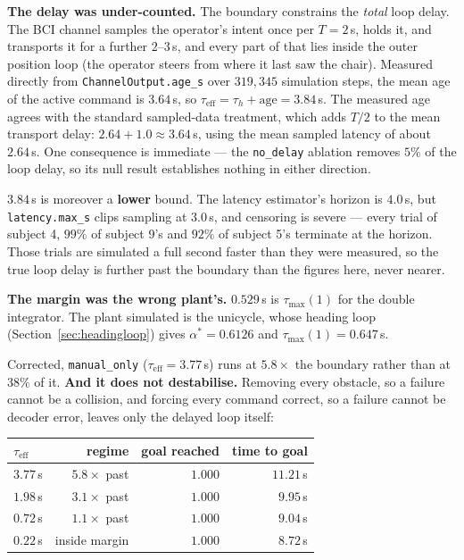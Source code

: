 \documentclass[11pt,a4paper]{article}
\newcommand{\vmanual}{\texttt{manual\_only}}
\newcommand{\astar}{\alpha^{*}}
\theoremstyle{plain}
\theoremstyle{definition}
\begin{document}
\textbf{The delay was under-counted.} The boundary constrains the
\emph{total} loop delay. The BCI channel samples the operator's intent
once per $T = 2$\,s, holds it, and transports it for a further
$2$--$3$\,s, and every part of that lies inside the outer position loop (the
operator steers from where it last saw the chair).
Measured directly from \texttt{ChannelOutput.age\_s} over $319{,}345$
simulation steps, the mean age of the active command is $3.64$\,s, so
$\tau_{\mathrm{eff}} = \tau_h + \mathrm{age} = 3.84$\,s. The
measured age agrees with the standard sampled-data treatment, which adds
$T/2$ to the mean transport delay: $2.64 + 1.0 \approx 3.64$\,s, using
the mean sampled latency of about $2.64$\,s. One consequence is immediate ---
the \texttt{no\_delay} ablation removes $5\%$ of the loop delay, so its
null result establishes nothing in either direction.

$3.84$\,s is moreover a \textbf{lower} bound. The latency estimator's
horizon is $4.0$\,s, but \texttt{latency.max\_s} clips sampling at
$3.0$\,s, and censoring is severe --- every trial of subject 4, $99\%$ of
subject 9's and $92\%$ of subject 5's terminate at the horizon. Those
trials are simulated a full second faster than they were measured, so the
true loop delay is further past the boundary than the figures here, never
nearer.

\textbf{The margin was the wrong plant's.} $0.529$\,s is
$\tau_{\max}(1)$ for the double integrator. The plant simulated is the
unicycle, whose heading loop (Section~\ref{sec:headingloop}) gives
$\astar = 0.6126$ and $\tau_{\max}(1) = 0.647$\,s.

Corrected, \vmanual{} ($\tau_{\mathrm{eff}} = 3.77$\,s) runs at $5.8\times$ the boundary rather than at
$38\%$ of it. \textbf{And it does not destabilise.} Removing every
obstacle, so a failure cannot be a collision, and forcing every command
correct, so a failure cannot be decoder error, leaves only the delayed
loop itself:

\begin{center}
\small
\begin{tabular}{@{}lrrr@{}}
\toprule
$\tau_{\mathrm{eff}}$ & regime & goal reached & time to goal \\
\midrule
$3.77$\,s & $5.8\times$ past & $1.000$ & $11.21$\,s \\
$1.98$\,s & $3.1\times$ past & $1.000$ & $9.95$\,s \\
$0.72$\,s & $1.1\times$ past & $1.000$ & $9.04$\,s \\
$0.22$\,s & inside margin    & $1.000$ & $8.72$\,s \\
\bottomrule
\end{tabular}
\end{center}
\end{document}
